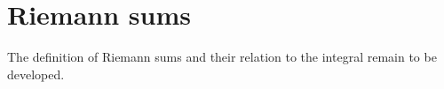 \section{Riemann sums}
\label{sec:analysis-i:riemann-sums}

The definition of Riemann sums and their relation
to the integral remain to be developed.
